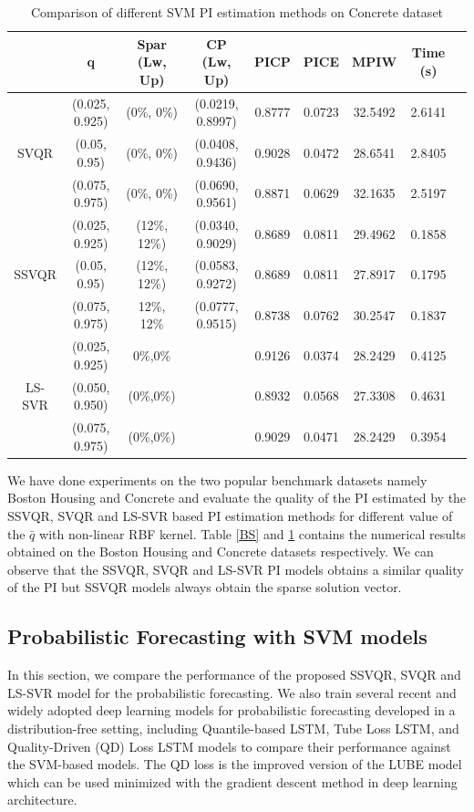 \documentclass[10pt]{article} %
\begin{document}
\begin{table}[htp]
    \centering
    {\fontsize{9}{10} \selectfont
    \begin{tabular}{|c|c|c|c|c|c|c|c|c|}
    \hline
      &  q & Spar (Lw, Up) & CP (Lw, Up) & PICP & PICE & MPIW & Time (s) \\ \hline
    \multirow{3}{*}{SVQR}  & (0.025, 0.925) & (0\%, 0\%) & (0.0219, 0.8997) & 0.8777 & 0.0723 & 32.5492 & 2.6141 \\ 
       & (0.05, 0.95) & (0\%, 0\%) & (0.0408, 0.9436) & 0.9028 & 0.0472 & 28.6541 & 2.8405 \\ 
       & (0.075, 0.975) & (0\%, 0\%) & (0.0690, 0.9561) & 0.8871 & 0.0629 & 32.1635 & 2.5197 \\ \hline
  \multirow{3}{*}{SSVQR}   &  (0.025, 0.925) & (12\%, 12\%) & (0.0340, 0.9029) & 0.8689 & 0.0811 & 29.4962 & 0.1858 \\ 
      &  (0.05, 0.95) & (12\%, 12\%) & (0.0583, 0.9272) & 0.8689 & 0.0811 & 27.8917 & 0.1795 \\ 
      &  (0.075, 0.975) & 12\%, 12\% & (0.0777, 0.9515) & 0.8738 & 0.0762 & 30.2547 & 0.1837 \\ \hline
    \multirow{3}{*}{LS-SVR}   &    (0.025, 0.925) &0\%,0\% & & 0.9126 & 0.0374 & 28.2429 & 0.4125 \\ 
     &   (0.050, 0.950) &(0\%,0\%)& & 0.8932 & 0.0568 & 27.3308 & 0.4631 \\
      &  (0.075, 0.975) &(0\%,0\%)&  &0.9029 & 0.0471 & 28.2429 & 0.3954 \\ \hline

    \end{tabular}}
    \caption{Comparison of different SVM PI estimation methods on Concrete dataset}
    \label{tab_para}
\end{table}


We have done experiments on the two popular benchmark datasets namely Boston Housing and Concrete  and evaluate the quality of the PI estimated by the SSVQR, SVQR and LS-SVR based PI estimation methods for different value of the $\bar{q}$ with non-linear RBF kernel.   Table \ref{BS} and \ref{tab_para} contains the numerical results obtained on the  Boston Housing and Concrete datasets respectively.  We can observe that the SSVQR, SVQR and LS-SVR PI models obtains a similar quality of the PI but SSVQR models always obtain the sparse solution vector. 

\subsection{ Probabilistic Forecasting  with SVM models}
In this section, we compare the performance of the  proposed SSVQR, SVQR and LS-SVR model for the probabilistic forecasting. We also train several recent and widely adopted deep learning models for probabilistic forecasting developed in a distribution-free setting, including Quantile-based LSTM, Tube Loss LSTM, and Quality-Driven (QD) Loss LSTM models \cite{pearce2018high} to compare their performance against the SVM-based models. The QD loss  \cite{pearce2018high} is the improved version of the LUBE model which can be used minimized with the gradient descent method in deep learning architecture. 
\end{document}
